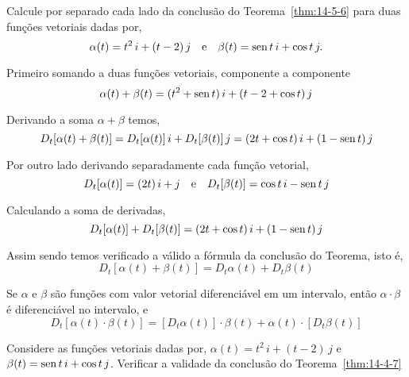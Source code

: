 \begin{exc}
Calcule por separado cada lado da conclusão do Teorema~\ref{thm:14-5-6} para duas funções vetoriais dadas por,
\begin{equation*}
\alpha(t)=t^{2}\, i +(t-2)\,j \quad \text{e} \quad  \beta(t)=\operatorname{sen} t\, i+\cos t\, j.
\end{equation*}
\end{exc}

\solo
Primeiro somando a duas funções vetoriais, componente a componente
\begin{equation*}
  \alpha(t)+\beta(t)=(t^{2}+\operatorname{sen} t)\, i + (t-2+\cos t)\,j
\end{equation*}

Derivando a soma \( \alpha+ \beta\) temos,
\begin{equation*}
D_{t}[\alpha(t)+\beta(t)]=D_{t}[\alpha(t)]\, i +D_{t}[\beta(t)]\, j=(2t+\cos t)\, i +(1-\operatorname{sen} t)\, j
\end{equation*}

Por outro lado derivando separadamente cada função vetorial,
\begin{equation*}
  D_{t}[\alpha(t)]=(2t)\, i + j\quad \text{e}\quad D_{t}[\beta(t)]=\cos t\, i -\operatorname{sen} t\, j
\end{equation*}

Calculando a soma de derivadas,
\begin{equation*}
  D_{t}[\alpha(t)]+D_{t}[\beta(t)] = (2t+\cos t)\, i +(1-\operatorname{sen} t)\, j
\end{equation*}

Assim sendo temos verificado a válido a fórmula da conclusão do Teorema, isto é,
\begin{equation*}
D_{t}[\alpha(t) +\beta(t)] = D_{t}\alpha(t) + D_{t}\beta(t)
\end{equation*}


\begin{teo}\label{thm:14-4-7}
Se \( \alpha\) e \(\beta\) são funções com valor vetorial diferenciável em um intervalo, então \(\alpha \cdot \beta\)
é diferenciável no intervalo, e
\begin{equation*}
D_{t}[\alpha(t) \cdot \beta(t)] = [D_{t}\alpha(t)]\cdot \beta(t) + \alpha(t)\cdot  [D_{t}\beta(t)]
\end{equation*}
\end{teo}

\begin{exc}
Considere as funções vetoriais dadas por,
\(\alpha(t)=t^{2}\, i +(t-2)\,j \) e \(\beta(t)=\operatorname{sen} t\, i+\cos t\, j \). Verificar a validade da conclusão do Teorema~\ref{thm:14-4-7}
\end{exc}

